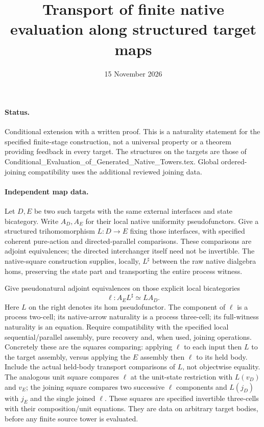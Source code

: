 \documentclass{article}
\title{Transport of finite native evaluation along structured target maps}
\date{15 November 2026}
\begin{document}
\maketitle
\paragraph{Status.} Conditional extension with a written proof. This is a naturality statement for the specified finite-stage construction, not a universal property or a theorem providing feedback in every target. The structures on the targets are those of Conditional\_Evaluation\_of\_Generated\_Native\_Towers.tex. Global ordered-joining compatibility uses the additional reviewed joining data.

\paragraph{Independent map data.} Let $D,E$ be two such targets with the same external interfaces and state bicategory. Write $A_D,A_E$ for their local native uniformity pseudofunctors. Give a structured trihomomorphism $L:D\to E$ fixing those interfaces, with specified coherent pure-action and directed-parallel comparisons. These comparisons are adjoint equivalences; the directed interchanger itself need not be invertible. The native-square construction supplies, locally, $L^\sharp$ between the raw native dialgebra homs, preserving the state part and transporting the entire process witness.

Give pseudonatural adjoint equivalences on those explicit local bicategories
\[
 \ell:A_E L^\sharp\simeq L A_D.
\]
Here $L$ on the right denotes its hom pseudofunctor. The component of $\ell$ is a process two-cell; its native-arrow naturality is a process three-cell; its full-witness naturality is an equation. Require compatibility with the specified local sequential/parallel assembly, pure recovery and, when used, joining operations. Concretely these are the squares comparing: applying $\ell$ to each input then $L$ to the target assembly, versus applying the $E$ assembly then $\ell$ to its held body. Include the actual held-body transport comparisons of $L$, not objectwise equality. The analogous unit square compares $\ell$ at the unit-state restriction with $L(v_D)$ and $v_E$; the joining square compares two successive $\ell$ components and $L(j_D)$ with $j_E$ and the single joined $\ell$. These squares are specified invertible three-cells with their composition/unit equations. They are data on arbitrary target bodies, before any finite source tower is evaluated.
\end{document}
